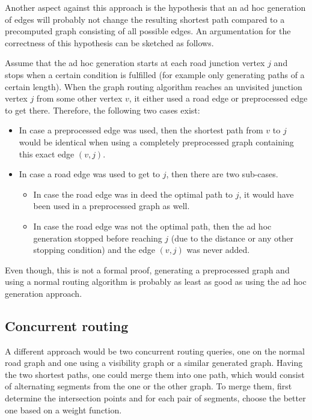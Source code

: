 		Another aspect against this approach is the hypothesis that an ad hoc generation of edges will probably not change the resulting shortest path compared to a precomputed graph consisting of all possible edges.
		An argumentation for the correctness of this hypothesis can be sketched as follows.
		
		Assume that the ad hoc generation starts at each road junction vertex $j$ and stops when a certain condition is fulfilled (for example only generating paths of a certain length).
		When the graph routing algorithm reaches an unvisited junction vertex $j$ from some other vertex $v$, it either used a road edge or preprocessed edge to get there. Therefore, the following two cases exist:
		
		\begin{itemize}
			\item In case a preprocessed edge was used, then the shortest path from $v$ to $j$ would be identical when using a completely preprocessed graph containing this exact edge $(v, j)$.
			\item In case a road edge was used to get to $j$, then there are two sub-cases.
			\begin{itemize}
				\item In case the road edge was in deed the optimal path to $j$, it would have been used in a preprocessed graph as well.
				\item In case the road edge was not the optimal path, then the ad hoc generation stopped before reaching $j$ (due to the distance or any other stopping condition) and the edge $(v, j)$ was never added.
			\end{itemize}
		\end{itemize}
		
		Even though, this is not a formal proof, generating a preprocessed graph and using a normal routing algorithm is probably as least as good as using the ad hoc generation approach.
	
	\subsection{Concurrent routing}
	
		A different approach would be two concurrent routing queries, one on the normal road graph and one using a visibility graph or a similar generated graph.
		Having the two shortest paths, one could merge them into one path, which would consist of alternating segments from the one or the other graph.
		To merge them, first determine the intersection points and for each pair of segments, choose the better one based on a weight function.
		
